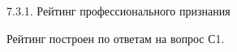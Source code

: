 \begin{frame}{7.3.1. Рейтинг профессионального признания }

\tiny
Рейтинг построен по ответам на вопрос С1.

\fontsize{5pt}{5}\selectfont
\begin{center}
\begin{tabular}{cllc}

\end{tabular}
\end{center}
\end{frame}


